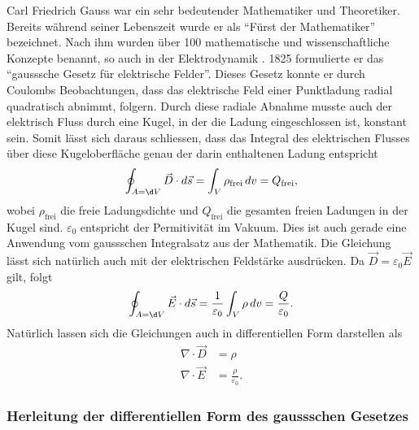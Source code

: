 Carl Friedrich Gauss war ein sehr bedeutender Mathematiker und Theoretiker.
Bereits während seiner Lebenszeit wurde er als ``Fürst der Mathematiker'' bezeichnet.
Nach ihm wurden über 100 mathematische und wissenschaftliche Konzepte benannt, so auch in der Elektrodynamik \cite{maxwell:Carl_Friedrich_Gauß}.
1825 formulierte er das ``gausssche Gesetz für elektrische Felder''.
Dieses Gesetz konnte er durch Coulombs Beobachtungen, dass das elektrische Feld einer Punktladung radial quadratisch abnimmt, folgern.
Durch diese radiale Abnahme musste auch der elektrisch Fluss durch eine Kugel, in der die Ladung eingeschlossen ist, konstant sein.
Somit lässt sich daraus schliessen, dass das Integral des elektrischen Flusses über diese Kugeloberfläche genau der darin enthaltenen Ladung entspricht \cite{maxwell:Gaußscher_Integralsatz}
\begin{equation}
\label{maxwell:equasion:elektrisch}
\oint_{A=\d V} \vec{D} \cdot d\vec{s}
=
\int_{V} \rho_{\text{frei}}\, dv
=
Q_{\text{frei}} ,
\end{equation}
wobei $\rho_{\text{frei}}$ die freie Ladungsdichte und $Q_{\text{frei}}$ die gesamten freien Ladungen in der Kugel sind. $\varepsilon_0$ entspricht der Permitivität im Vakuum. Dies ist auch gerade eine Anwendung vom gaussschen Integralsatz aus der Mathematik.
Die Gleichung lässt sich natürlich auch mit der elektrischen Feldstärke ausdrücken. Da $\vec{D} = \varepsilon_0 \vec{E}$ gilt, folgt
\[
\oint_{A=\d V} \vec{E} \cdot d\vec{s}
=
\frac{1}{\varepsilon_0}\int_{V} \rho\, dv
=
\frac{Q}{\varepsilon_0} .
\]
Natürlich lassen sich die Gleichungen auch in differentiellen Form darstellen als
\begin{align*}
	\nabla \cdot \vec{D}
	&=
	\rho
	\\
	\nabla \cdot \vec{E}
	&=
	\frac{\rho}{\varepsilon_0} .
\end{align*}

\subsubsection{Herleitung der differentiellen Form des gaussschen Gesetzes}

